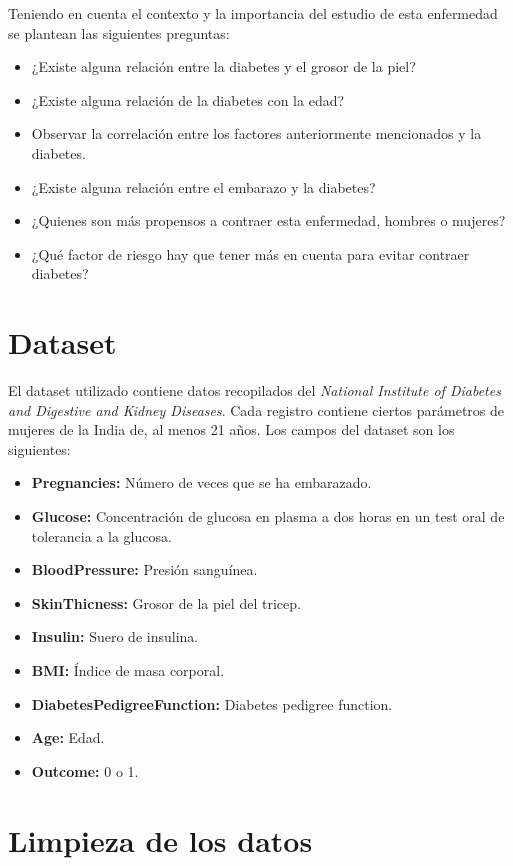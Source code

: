 \documentclass{article}
\begin{document}
Teniendo en cuenta el contexto y la importancia del estudio de esta enfermedad se plantean las siguientes preguntas:
\begin{itemize}
	\item ¿Existe alguna relación entre la diabetes y el grosor de la piel?
	\item ¿Existe alguna relación de la diabetes con la edad?
	\item Observar la correlación entre los factores anteriormente mencionados y la diabetes.
	\item ¿Existe alguna relación entre el embarazo y la diabetes?
	\item ¿Quienes son más propensos a contraer esta enfermedad, hombres o mujeres?
	\item ¿Qué factor de riesgo hay que tener más en cuenta para evitar contraer diabetes?
\end{itemize}


\section{Dataset}

El dataset utilizado contiene datos recopilados del \emph{National Institute of Diabetes and Digestive and Kidney Diseases}. Cada registro contiene ciertos parámetros de mujeres de la India de, al menos 21 años. Los campos del dataset son los siguientes:

\begin{itemize}
	\item \textbf{Pregnancies:} Número de veces que se ha embarazado.
	\item \textbf{Glucose:} Concentración de glucosa en plasma a dos horas en un test oral de tolerancia a la glucosa. 
	\item \textbf{BloodPressure:} Presión sanguínea.
	\item \textbf{SkinThicness:} Grosor de la piel del tricep.
	\item \textbf{Insulin:} Suero de insulina.
	\item \textbf{BMI:} Índice de masa corporal.
	\item \textbf{DiabetesPedigreeFunction:} Diabetes pedigree function.
	\item \textbf{Age:} Edad.
	\item \textbf{Outcome:} 0 o 1.
\end{itemize}


\section{Limpieza de los datos}



\onecolumn{
  
  
}
\end{document}
